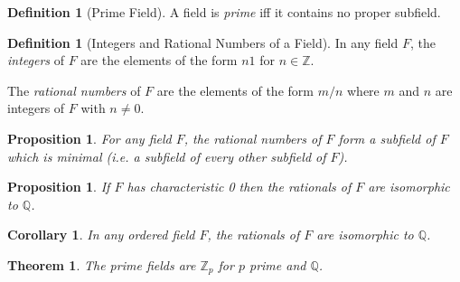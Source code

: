 \documentclass{article}
\newtheorem{proposition}[axiom]{Proposition}
\newtheorem{theorem}[axiom]{Theorem}
\newtheorem{corollary}{Corollary}[axiom]
\theoremstyle{definition}
\newtheorem{definition}[axiom]{Definition}
\begin{document}
    \begin{definition}[Prime Field]
        A field is \emph{prime} iff it contains no proper subfield.
    \end{definition}

    \begin{definition}[Integers and Rational Numbers of a Field]
        In any field $F$, the \emph{integers} of $F$ are the elements of the form $n1$ for $n \in \mathbb{Z}$.

        The \emph{rational numbers} of $F$ are the elements of the form $m/n$ where $m$ and $n$ are integers
        of $F$ with $n \neq 0$.
    \end{definition}

    \begin{proposition}
        For any field $F$, the rational numbers of $F$ form a subfield of $F$ which is minimal (i.e. a subfield
        of every other subfield of $F$).
    \end{proposition}

    \begin{proposition}
        If $F$ has characteristic 0 then the rationals of $F$ are isomorphic to $\mathbb{Q}$.
    \end{proposition}

    \begin{corollary}
        In any ordered field $F$, the rationals of $F$ are isomorphic to $\mathbb{Q}$.
    \end{corollary}

    \begin{theorem}
        The prime fields are $\mathbb{Z}_p$ for $p$ prime and $\mathbb{Q}$.
    \end{theorem}
\end{document}
